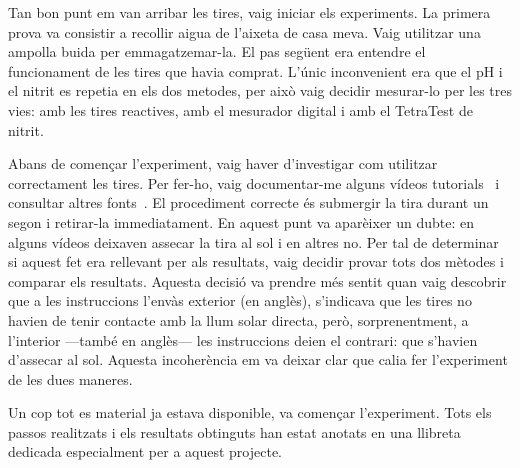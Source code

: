 Tan bon punt em van arribar les tires, vaig iniciar els experiments. La primera prova va consistir a recollir aigua de l’aixeta de casa meva. Vaig utilitzar una ampolla buida per emmagatzemar-la. El pas següent era entendre el funcionament de les tires que havia comprat. L’únic inconvenient era que el pH i el nitrit es repetia en els dos metodes, per això vaig decidir mesurar-lo per les tres vies: amb les tires reactives, amb el mesurador digital i amb el TetraTest de nitrit.


Abans de començar l'experiment, vaig haver d’investigar com utilitzar correctament les tires. Per fer-ho, vaig documentar-me alguns vídeos tutorials~\cite{VideosDeSuport} i consultar altres fonts~\cite{FontsPerTires}. El procediment correcte és submergir la tira durant un segon i retirar-la immediatament. En aquest punt va aparèixer un dubte: en alguns vídeos deixaven assecar la tira al sol i en altres no. Per tal de determinar si aquest fet era rellevant per als resultats, vaig decidir provar tots dos mètodes i comparar els resultats. Aquesta decisió va prendre més sentit quan vaig descobrir que a les instruccions l’envàs exterior (en anglès), s’indicava que les tires no havien de tenir contacte amb la llum solar directa, però, sorprenentment, a l’interior —també en anglès— les instruccions deien el contrari: que s’havien d’assecar al sol. Aquesta incoherència em va deixar clar que calia fer l’experiment de les dues maneres.



Un cop tot es material ja estava disponible, va començar l'experiment. Tots els passos realitzats i els resultats obtinguts han estat anotats en una llibreta dedicada especialment per a aquest projecte.

